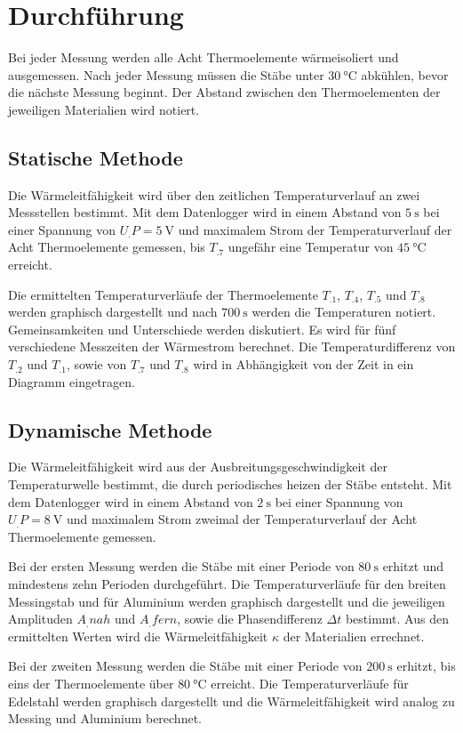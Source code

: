 
\section{Durchführung}
\label{sec:Durchführung}

Bei jeder Messung werden alle Acht Thermoelemente wärmeisoliert und ausgemessen.
Nach jeder Messung müssen die Stäbe unter $\SI{30}{\celsius}$ abkühlen, bevor die nächste Messung beginnt. Der Abstand zwischen den Thermoelementen der jeweiligen Materialien wird notiert. 

\subsection{Statische Methode}

Die Wärmeleitfähigkeit wird über den zeitlichen Temperaturverlauf an zwei Messstellen bestimmt.
Mit dem Datenlogger wird in einem Abstand von $\SI{5}{\second}$ bei einer Spannung von $U_.P = \SI{5}{\volt}$ und maximalem Strom der Temperaturverlauf der Acht Thermoelemente gemessen, bis $T_.7$ ungefähr eine Temperatur von $\SI{45}{\celsius}$ erreicht.

Die ermittelten Temperaturverläufe der Thermoelemente $T_.1$, $T_.4$, $T_.5$ und $T_.8$ werden graphisch dargestellt und nach $\SI{700}{\second}$ werden die Temperaturen notiert. Gemeinsamkeiten und Unterschiede werden diskutiert. 
Es wird für fünf verschiedene Messzeiten der Wärmestrom berechnet. 
Die Temperaturdifferenz von $T_.2$ und $T_.1$, sowie von $T_.7$ und $T_.8$ wird in Abhängigkeit von der Zeit in ein Diagramm eingetragen.
 
\subsection{Dynamische Methode}

Die Wärmeleitfähigkeit wird aus der Ausbreitungsgeschwindigkeit der Temperaturwelle bestimmt, die durch periodisches heizen der Stäbe entsteht.
Mit dem Datenlogger wird in einem Abstand von $\SI{2}{\second}$ bei einer Spannung von $U_.P = \SI{8}{\volt}$ und maximalem Strom zweimal der Temperaturverlauf der Acht Thermoelemente gemessen.

Bei der ersten Messung werden die Stäbe mit einer Periode von $\SI{80}{\second}$ erhitzt und mindestens zehn Perioden durchgeführt.
Die Temperaturverläufe für den breiten Messingstab und für Aluminium werden graphisch dargestellt und die jeweiligen Amplituden $A_.{nah}$ und $A_.{fern}$, sowie die Phasendifferenz $\Delta t$ bestimmt. Aus den ermittelten Werten wird die Wärmeleitfähigkeit $\kappa$ der Materialien errechnet. 

Bei der zweiten Messung werden die Stäbe mit einer Periode von $\SI{200}{\second}$ erhitzt, bis eins der Thermoelemente über $\SI{80}{\celsius}$ erreicht.
Die Temperaturverläufe für Edelstahl werden graphisch dargestellt und die Wärmeleitfähigkeit wird analog zu Messing und Aluminium berechnet.